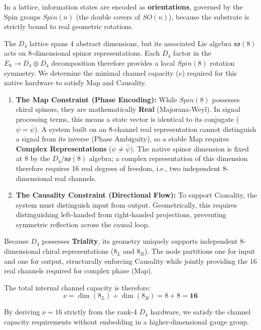 In a lattice, information states are encoded as \textbf{orientations}, governed by the Spin groups $Spin(n)$ (the double covers of $SO(n)$), because the substrate is strictly bound to real geometric rotations.

The $D_4$ lattice spans 4 abstract dimensions, but its associated Lie algebra $\mathfrak{so}(8)$ acts on 8-dimensional spinor representations. Each $D_4$ factor in the $E_8 \to D_4 \oplus D_4$ decomposition therefore provides a local $Spin(8)$ rotation symmetry. We determine the minimal channel capacity ($\nu$) required for this native hardware to satisfy Map and Causality.

\begin{enumerate}
    \item \textbf{The Map Constraint (Phase Encoding):}  
    While $Spin(8)$ possesses chiral spinors, they are mathematically \textbf{Real} (Majorana-Weyl). In signal processing terms, this means a state vector is identical to its conjugate ($\psi = \bar{\psi}$). A system built on an 8-channel real representation cannot distinguish a signal from its inverse (Phase Ambiguity), so a stable Map requires \textbf{Complex Representations} ($\psi \neq \bar{\psi}$). The native spinor dimension is fixed at 8 by the $D_4$/$\mathfrak{so}(8)$ algebra; a complex representation of this dimension therefore requires 16 real degrees of freedom, i.e., two independent 8-dimensional real channels.

    \item \textbf{The Causality Constraint (Directional Flow):} 
    To support Causality, the system must distinguish input from output. Geometrically, this requires distinguishing left-handed from right-handed projections, preventing symmetric reflection across the causal loop.
\end{enumerate}

Because $D_4$ possesses \textbf{Triality}, its geometry uniquely supports independent 8-dimensional chiral representations ($8_L$ and $8_R$). The node partitions one for input and one for output, structurally enforcing Causality while jointly providing the 16 real channels required for complex phase (Map).

The total internal channel capacity is therefore:
\begin{equation}
    \nu = \dim(8_L) + \dim(8_R) = 8 + 8 = \mathbf{16}
\end{equation}

By deriving $\nu = 16$ strictly from the rank-4 $D_4$ hardware, we satisfy the channel capacity requirements without embedding in a higher-dimensional gauge group.

